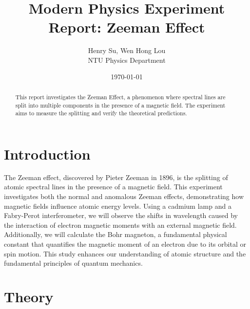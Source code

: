 \documentclass[a4paper,12pt]{article}
\title{Modern Physics Experiment Report: Zeeman Effect}
\author{Henry Su, Wen Hong Lou\\ NTU Physics Department}
\date{\today}
\begin{document}
\maketitle

\begin{abstract}
This report investigates the Zeeman Effect, a phenomenon where spectral lines are split into multiple components in the presence of a magnetic field. The experiment aims to measure the splitting and verify the theoretical predictions. 
\end{abstract}

\tableofcontents
\newpage

\section{Introduction}
The Zeeman effect, discovered by Pieter Zeeman in 1896, is the splitting of atomic spectral lines in the presence of a magnetic field. This experiment investigates both the normal and anomalous Zeeman effects, demonstrating how magnetic fields influence atomic energy levels. Using a cadmium lamp and a Fabry-Perot interferometer, we will observe the shifts in wavelength caused by the interaction of electron magnetic moments with an external magnetic field. Additionally, we will calculate the Bohr magneton, a fundamental physical constant that quantifies the magnetic moment of an electron due to its orbital or spin motion. This study enhances our understanding of atomic structure and the fundamental principles of quantum mechanics.\section{Theory}
\end{document}

